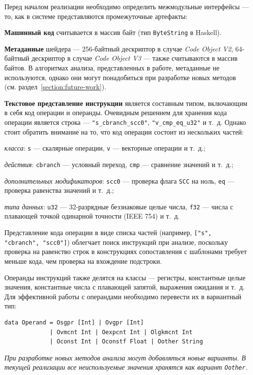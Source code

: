 \documentclass[a4paper,14pt]{extarticle}
\begin{document}
{Перед началом реализации необходимо определить межмодульные интерфейсы —
то, как в системе представляются промежуточные артефакты:

\begin{ol}
\item \textbf{Машинный код} считывается в массив байт (тип \verb|ByteString| в Haskell).
\item \textbf{Метаданные} шейдера — 256-байтный дескриптор в случае \textit{Code Object V2},
64-байтный дескриптор в случае \textit{Code Object V3} — также считываются в массив байтов. %
В алгоритмах анализа, представленных в работе, метаданные не используются, однако они
могут понадобиться при разработке новых методов (см. раздел~\ref{section:future-work}).
\item \textbf{Текстовое представление инструкции} является составным типом, включающим
в себя код операции и операнды. Очевидным решением для хранения кода операции
является строка — \verb|"s_cbranch_scc0"|, \verb|"v_cmp_eq_u32"| и т.~д. Однако
стоит обратить внимание на то, что код операции состоит из нескольких частей:
\begin{ul}
\item \textit{класса}: \verb|s| — скалярные операции, \verb|v| — векторные операции и т.~д.;
\item \textit{действия}: \verb|cbranch| — условный переход, \verb|cmp| — сравнение значений и т.~д.;
\item \textit{дополнительных модификаторов}: \verb|scc0| — проверка флага \verb|SCC| на ноль,
\verb|eq| — проверка равенства значений и т.~д.;
\item \textit{типа данных}: \verb|u32| — 32-разрядные беззнаковые целые числа, \verb|f32| —
числа с плавающей точкой одинарной точности (IEEE 754) и т.~д.
\end{ul}
Представление кода операции в виде списка частей (например, \verb|["s", "cbranch", "scc0"]|)
облегчает поиск инструкций при анализе, поскольку проверка на равенство строк в конструкциях
сопоставления с шаблонами требует меньше кода, чем проверка на вхождение подстроки.

Операнды инструкций также делятся на классы — регистры, константные целые значения, константные
числа с плавающей запятой, выражения ожидания и т.~д. Для эффективной работы с операндами
необходимо перевести их в вариантный тип:
\begin{verbatim}
data Operand = Osgpr [Int] | Ovgpr [Int]
             | Ovmcnt Int | Oexpcnt Int | Olgkmcnt Int
             | Oconst Int | Oconstf Float | Oother String
\end{verbatim}
\textit{При разработке новых методов анализа могут добавляться новые варианты. В текущей реализации
все неиспользуемые значения хранятся как вариант \texttt{Oother}.}


\end{ol}}
\end{document}
